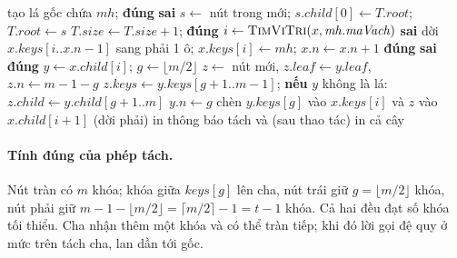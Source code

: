\begin{algorithm}[htbp]
\caption{Chèn mặt hàng () và tách nút}\label{alg:chen}
\begin{algorithmic}[1]
   \State tạo lá gốc chứa $\mathit{mh}$; \Return \textbf{đúng} \EndIf
   \State \Return \textbf{sai}  \EndIf
   
    \State $s \gets$ nút trong mới; $s.\mathit{child}[0] \gets T.\mathit{root}$; $T.\mathit{root} \gets s$
    \State {}
  \EndIf
  \State $T.\mathit{size} \gets T.\mathit{size} + 1$; \Return \textbf{đúng}
\EndFunction
\Statex
{}
  \State $i \gets \Call{TimViTri}{x, \mathit{mh}.\mathit{maVach}}$
   \State \Return \textbf{sai} \EndIf
    \State dời $x.\mathit{keys}[i..x.n-1]$ sang phải 1 ô; $x.\mathit{keys}[i] \gets \mathit{mh}$; $x.n \gets x.n+1$
    \State \Return \textbf{đúng} 
  \EndIf
   \State \Return \textbf{sai} \EndIf
   \State {} \EndIf
  \State \Return \textbf{đúng}
\EndFunction
\Statex
{} 
  \State $y \gets x.\mathit{child}[i]$; $g \gets \lfloor m/2 \rfloor$
  \State $z \gets$ nút mới, $z.\mathit{leaf} \gets y.\mathit{leaf}$, $z.n \gets m-1-g$
  \State $z.\mathit{keys} \gets y.\mathit{keys}[g+1..m-1]$; \textbf{nếu} $y$ không là lá: $z.\mathit{child} \gets y.\mathit{child}[g+1..m]$
  \State $y.n \gets g$
  \State chèn $y.\mathit{keys}[g]$ vào $x.\mathit{keys}[i]$ và $z$ vào $x.\mathit{child}[i+1]$ (dời phải)
   \State in thông báo tách và (sau thao tác) in cả cây \EndIf
\EndProcedure
\end{algorithmic}
\end{algorithm}

\paragraph{Tính đúng của phép tách.} Nút tràn có $m$ khóa; khóa giữa $\mathit{keys}[g]$ lên cha, nút trái giữ
$g = \lfloor m/2\rfloor$ khóa, nút phải giữ $m-1-\lfloor m/2\rfloor = \lceil m/2\rceil - 1 = t-1$ khóa. Cả hai
đều đạt số khóa tối thiểu. Cha nhận thêm một khóa và có thể tràn tiếp; khi đó lời gọi đệ quy ở mức trên tách
cha, lan dần tới gốc.

